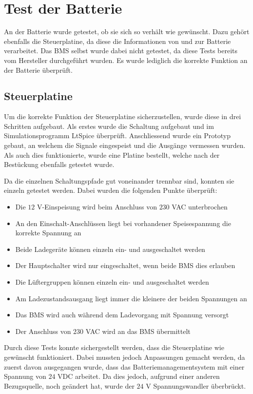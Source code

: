 \section{Test der Batterie}
An der Batterie wurde getestet, ob sie sich so verhält wie gewünscht. Dazu gehört ebenfalls die Steuerplatine, da diese die Informationen von und zur Batterie verarbeitet. Das BMS selbst wurde dabei nicht getestet, da diese Tests bereits vom Hersteller durchgeführt wurden. Es wurde lediglich die korrekte Funktion an der Batterie überprüft.

\subsection{Steuerplatine}
Um die korrekte Funktion der Steuerplatine sicherzustellen, wurde diese in drei Schritten aufgebaut. Als erstes wurde die Schaltung aufgebaut und im Simulationsprogramm LtSpice überprüft. Anschliessend wurde ein Prototyp gebaut, an welchem die Signale eingespeist und die Ausgänge vermessen wurden. Als auch dies funktionierte, wurde eine Platine bestellt, welche nach der Bestückung ebenfalls getestet wurde.

Da die einzelnen Schaltungspfade gut voneinander trennbar sind, konnten sie einzeln getestet werden. Dabei wurden die folgenden Punkte überprüft: \begin{itemize}
	\item Die $12$ V-Einspeisung wird beim Anschluss von $230$ VAC unterbrochen
	\item An den Einschalt-Anschlüssen liegt bei vorhandener Speisespannung die korrekte Spannung an
	\item Beide Ladegeräte können einzeln ein- und ausgeschaltet werden
	\item Der Hauptschalter wird nur eingeschaltet, wenn beide BMS dies erlauben
	\item Die Lüftergruppen können einzeln ein- und ausgeschaltet werden
	\item Am Ladezustandsausgang liegt immer die kleinere der beiden Spannungen an
	\item Das BMS wird auch während dem Ladevorgang mit Spannung versorgt
	\item Der Anschluss von $230$ VAC wird an das BMS übermittelt
\end{itemize}

Durch diese Tests konnte sichergestellt werden, dass die Steuerplatine wie gewünscht funktioniert. Dabei mussten jedoch Anpassungen gemacht werden, da zuerst davon ausgegangen wurde, dass das Batteriemanagementsystem mit einer Spannung von $24$ VDC arbeitet. Da dies jedoch, aufgrund einer anderen Bezugsquelle, noch geändert hat, wurde der $24$ V Spannungswandler überbrückt.


